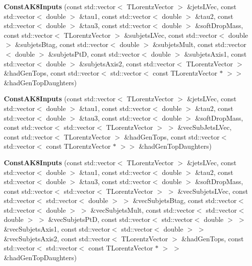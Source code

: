 \begin{DoxyCompactItemize}
\item 
\hypertarget{classttUtility_1_1ConstAK8Inputs_a3383d6cf39e78b5cf3e36fe6b3b0664e}{{\bfseries Const\-A\-K8\-Inputs} (const std\-::vector$<$ T\-Lorentz\-Vector $>$ \&jets\-L\-Vec, const std\-::vector$<$ double $>$ \&tau1, const std\-::vector$<$ double $>$ \&tau2, const std\-::vector$<$ double $>$ \&tau3, const std\-::vector$<$ double $>$ \&soft\-Drop\-Mass, const std\-::vector$<$ T\-Lorentz\-Vector $>$ \&subjets\-L\-Vec, const std\-::vector$<$ double $>$ \&subjets\-Btag, const std\-::vector$<$ double $>$ \&subjets\-Mult, const std\-::vector$<$ double $>$ \&subjets\-Pt\-D, const std\-::vector$<$ double $>$ \&subjets\-Axis1, const std\-::vector$<$ double $>$ \&subjets\-Axis2, const std\-::vector$<$ T\-Lorentz\-Vector $>$ \&had\-Gen\-Tops, const std\-::vector$<$ std\-::vector$<$ const T\-Lorentz\-Vector $\ast$ $>$$>$ \&had\-Gen\-Top\-Daughters)}\label{classttUtility_1_1ConstAK8Inputs_a3383d6cf39e78b5cf3e36fe6b3b0664e}

\item 
\hypertarget{classttUtility_1_1ConstAK8Inputs_aded941e18d86f235e8e20101fda1e940}{{\bfseries Const\-A\-K8\-Inputs} (const std\-::vector$<$ T\-Lorentz\-Vector $>$ \&jets\-L\-Vec, const std\-::vector$<$ double $>$ \&tau1, const std\-::vector$<$ double $>$ \&tau2, const std\-::vector$<$ double $>$ \&tau3, const std\-::vector$<$ double $>$ \&soft\-Drop\-Mass, const std\-::vector$<$ std\-::vector$<$ T\-Lorentz\-Vector $>$ $>$ \&vec\-Sub\-Jets\-L\-Vec, const std\-::vector$<$ T\-Lorentz\-Vector $>$ \&had\-Gen\-Tops, const std\-::vector$<$ std\-::vector$<$ const T\-Lorentz\-Vector $\ast$ $>$$>$ \&had\-Gen\-Top\-Daughters)}\label{classttUtility_1_1ConstAK8Inputs_aded941e18d86f235e8e20101fda1e940}

\item 
\hypertarget{classttUtility_1_1ConstAK8Inputs_ab3d140c716138d7b6b48273ae00d20db}{{\bfseries Const\-A\-K8\-Inputs} (const std\-::vector$<$ T\-Lorentz\-Vector $>$ \&jets\-L\-Vec, const std\-::vector$<$ double $>$ \&tau1, const std\-::vector$<$ double $>$ \&tau2, const std\-::vector$<$ double $>$ \&tau3, const std\-::vector$<$ double $>$ \&soft\-Drop\-Mass, const std\-::vector$<$ std\-::vector$<$ T\-Lorentz\-Vector $>$ $>$ \&vec\-Subjets\-L\-Vec, const std\-::vector$<$ std\-::vector$<$ double $>$ $>$ \&vec\-Subjets\-Btag, const std\-::vector$<$ std\-::vector$<$ double $>$ $>$ \&vec\-Subjets\-Mult, const std\-::vector$<$ std\-::vector$<$ double $>$ $>$ \&vec\-Subjets\-Pt\-D, const std\-::vector$<$ std\-::vector$<$ double $>$ $>$ \&vec\-Subjets\-Axis1, const std\-::vector$<$ std\-::vector$<$ double $>$ $>$ \&vec\-Subjets\-Axis2, const std\-::vector$<$ T\-Lorentz\-Vector $>$ \&had\-Gen\-Tops, const std\-::vector$<$ std\-::vector$<$ const T\-Lorentz\-Vector $\ast$ $>$ $>$ \&had\-Gen\-Top\-Daughters)}\label{classttUtility_1_1ConstAK8Inputs_ab3d140c716138d7b6b48273ae00d20db}


\end{DoxyCompactItemize}
